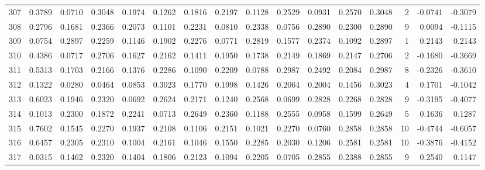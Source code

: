 \begin{tabular}{lrrrrrrrrrrrrrrr}
307 &      0.3789 &  0.0710 &  0.3048 &  0.1974 &  0.1262 &  0.1816 &  0.2197 &  0.1128 &  0.2529 &  0.0931 &   0.2570 &     0.3048 &      2 &                   -0.0741 &                    -0.3079 \\
308 &      0.2796 &  0.1681 &  0.2366 &  0.2073 &  0.1101 &  0.2231 &  0.0810 &  0.2338 &  0.0756 &  0.2890 &   0.2300 &     0.2890 &      9 &                    0.0094 &                    -0.1115 \\
309 &      0.0754 &  0.2897 &  0.2259 &  0.1146 &  0.1902 &  0.2276 &  0.0771 &  0.2819 &  0.1577 &  0.2374 &   0.1092 &     0.2897 &      1 &                    0.2143 &                     0.2143 \\
310 &      0.4386 &  0.0717 &  0.2706 &  0.1627 &  0.2162 &  0.1411 &  0.1950 &  0.1738 &  0.2149 &  0.1869 &   0.2147 &     0.2706 &      2 &                   -0.1680 &                    -0.3669 \\
311 &      0.5313 &  0.1703 &  0.2166 &  0.1376 &  0.2286 &  0.1090 &  0.2209 &  0.0788 &  0.2987 &  0.2492 &   0.2084 &     0.2987 &      8 &                   -0.2326 &                    -0.3610 \\
312 &      0.1322 &  0.0280 &  0.0464 &  0.0853 &  0.3023 &  0.1770 &  0.1998 &  0.1426 &  0.2064 &  0.2004 &   0.1456 &     0.3023 &      4 &                    0.1701 &                    -0.1042 \\
313 &      0.6023 &  0.1946 &  0.2320 &  0.0692 &  0.2624 &  0.2171 &  0.1240 &  0.2568 &  0.0699 &  0.2828 &   0.2268 &     0.2828 &      9 &                   -0.3195 &                    -0.4077 \\
314 &      0.1013 &  0.2300 &  0.1872 &  0.2241 &  0.0713 &  0.2649 &  0.2360 &  0.1188 &  0.2555 &  0.0958 &   0.1599 &     0.2649 &      5 &                    0.1636 &                     0.1287 \\
315 &      0.7602 &  0.1545 &  0.2270 &  0.1937 &  0.2108 &  0.1106 &  0.2151 &  0.1021 &  0.2270 &  0.0760 &   0.2858 &     0.2858 &     10 &                   -0.4744 &                    -0.6057 \\
316 &      0.6457 &  0.2305 &  0.2310 &  0.1004 &  0.2161 &  0.1046 &  0.1550 &  0.2285 &  0.2030 &  0.1206 &   0.2581 &     0.2581 &     10 &                   -0.3876 &                    -0.4152 \\
317 &      0.0315 &  0.1462 &  0.2320 &  0.1404 &  0.1806 &  0.2123 &  0.1094 &  0.2205 &  0.0705 &  0.2855 &   0.2388 &     0.2855 &      9 &                    0.2540 &                     0.1147 \\

\end{tabular}

